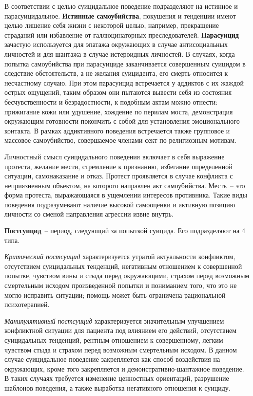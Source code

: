 В соответствии с целью суицидальное поведение подразделяют на истинное и парасуицидальное. \textbf{Истинные самоубийства}, покушения и тенденции имеют целью лишение себя жизни с некоторой целью, например, прекращение страданий или избавление от галлюцинаторных преследователей. \textbf{Парасуицид} зачастую используется для эпатажа окружающих в случае антисоциальных личностей и для шантажа в случае истероидных личностей. В случаях, когда попытка самоубийства при парасуициде заканчивается совершенным суицидом в следствие обстоятельств, а не желания суицидента, его смерть относится к несчастному случаю. При этом парасуицид встречается у аддиктов с их жаждой острых ощущений, таким образом они пытаются вывести себя из состояния бесчувственности и безрадостности, к подобным актам можно отнести: прижигание кожи или удушение, хождение по перилам моста, демонстрация окружающим готовности покончить с собой для установления эмоционального контакта. В рамках аддиктивного поведения встречается также групповое и массовое самоубийство, совершаемое членами сект по религиозным мотивам.~\cite{starsen}

Личностный смысл суицидального поведения включает в себя выражение протеста, желание мести, стремление к признанию, избегание определенной ситуации, самонаказание и отказ. Протест проявляется в случае конфликта с неприязненным объектом, на которого направлен акт самоубийства. Месть~-- это форма протеста, выражающаяся в ущемлении интересов противника. Такие виды поведения подразумевают наличие высокой самооценки и активную позицию личности со сменой направления агрессии извне внутрь.~\cite{starsen}

\textbf{Постсуицид}~-- период, следующий за попыткой суицида. Его подразделяют на 4 типа.~\cite{starsen}

\textit{Критический постсуицид} характеризуется утратой актуальности конфликтом, отсутствием суицидальных тенденций, негативным отношением к совершенной попытке, чувством вины и стыда перед окружающими, страхом перед возможным смертельным исходом произведенной попытки и пониманием того, что это не могло исправить ситуации; помощь может быть ограничена рациональной психотерапией.

\textit{Манипулятивный постсуицид} характеризуется значительным улучшением конфликтной ситуации для пациента под влиянием его действий, отсутствием суицидальных тенденций, рентным отношением к совершенному, легким чувством стыда и страхом перед возможным смертельным исходом. В данном случае суицидальное поведение закрепляется как способ воздействия на окружающих, кроме того закрепляется и демонстративно-шантажное поведение. В таких случаях требуется изменение ценностных ориентаций, разрушение шаблонов поведения, а также выработка негативного отношения к суициду.

